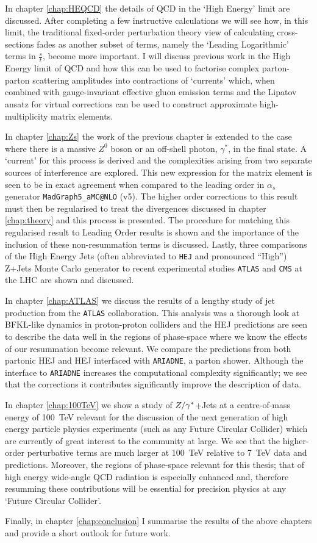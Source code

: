 	In chapter \ref{chap:HEQCD} the details of QCD in the `High Energy' limit are discussed.  After completing a
	few instructive calculations we will see how, in this limit, the traditional fixed-order perturbation theory
	view of calculating cross-sections fades as another subset of terms, namely the `Leading Logarithmic' terms in
	$\frac{s}{t}$, become more important.  I will discuss previous work in the High Energy limit of QCD and how
	this can be used to factorise complex parton-parton scattering amplitudes into contractions of `currents' which,
	when combined with gauge-invariant effective gluon emission terms and the Lipatov ansatz for virtual corrections
	can be used to construct approximate high-multiplicity matrix elements.

	In chapter \ref{chap:Zs} the work of the previous chapter is extended to the case where there is a massive
	$Z^0$ boson or an off-shell photon, $\gamma^*$, in the final state.  A `current' for this process is derived
	and the complexities arising from two separate sources of interference are explored.  This new expression for the
	matrix element is seen to be in exact agreement when compared to the leading order in $\alpha_s$ generator
	\texttt{MadGraph5\_aMC@NLO} (v5). The higher order corrections to this result must then be regularised to treat
	the divergences discussed in chapter \ref{chap:theory} and this process is presented.  The procedure for matching this regularised result to Leading
	Order results is shown and the importance of the inclusion of these non-resummation terms is discussed. Lastly,
	three comparisons of the High Energy Jets (often abbreviated to \texttt{HEJ} and pronounced ``High'') Z+Jets
	Monte Carlo generator to recent experimental studies \texttt{ATLAS} and \texttt{CMS} at the LHC are shown and discussed.

	In chapter \ref{chap:ATLAS} we discuss the results of a lengthy study of jet production from the \texttt{ATLAS}
	collaboration.  This analysis was a thorough look at BFKL-like dynamics in proton-proton colliders and the HEJ
	predictions are seen to describe the data well in the regions of phase-space where we know the effects of our
	resummation become relevant.  We compare the predictions from both partonic HEJ and HEJ interfaced with
	\texttt{ARIADNE}, a parton shower.  Although the interface to \texttt{ARIADNE}
	increases the computational complexity significantly; we see that the corrections it contributes significantly
	improve the description of data.

	In chapter \ref{chap:100TeV} we show a study of $Z/\gamma^*$+Jets at a centre-of-mass energy of 100~TeV relevant for the
	discussion of the next generation of high energy particle physics experiments (such as any Future Circular Collider)
	which are currently of great interest to the community at large.  We see that the higher-order perturbative terms are
	much larger at 100~TeV relative to 7~TeV data and predictions.  Moreover, the regions of phase-space relevant
	for this thesis; that of high energy wide-angle QCD radiation is especially enhanced and, therefore resumming
	these contributions will be essential for precision physics at any `Future Circular Collider'.

	Finally, in chapter \ref{chap:conclusion} I summarise the results of the above chapters and provide a short
	outlook for future work.

